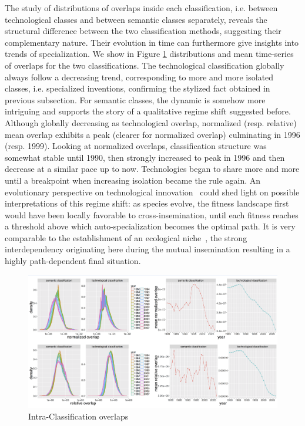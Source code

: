 \documentclass[article]{article}%
\begin{document}
The study of distributions of overlaps inside each classification, i.e. between technological classes and between semantic classes separately, reveals the structural difference between the two classification methods, suggesting their complementary nature. Their evolution in time can furthermore give insights into trends of specialization. We show in Figure \ref{fig:intra-classif-overlap} distributions and mean time-series of overlaps for the two classifications. The technological classification globally always follow a decreasing trend, corresponding to more and more isolated classes, i.e. specialized inventions, confirming the stylized fact obtained in previous subsection. For semantic classes, the dynamic is somehow more intriguing and supports the story of a qualitative regime shift suggested before. Although globally decreasing as technological overlap, normalized (resp. relative) mean overlap exhibits a peak (clearer for normalized overlap) culminating in 1996 (resp. 1999). Looking at normalized overlaps, classification structure was somewhat stable until 1990, then strongly increased to peak in 1996 and then decrease at a similar pace up to now. Technologies began to share more and more until a breakpoint when increasing isolation became the rule again. An evolutionary perspective on technological innovation~\cite{ziman2003technological} could shed light on possible interpretations of this regime shift: as species evolve, the fitness landscape first would have been locally favorable to cross-insemination, until each fitness reaches a threshold above which auto-specialization becomes the optimal path. It is very comparable to the establishment of an ecological niche~\cite{holland2012signals}, the strong interdependency originating here during the mutual insemination resulting in a highly path-dependent final situation. 


\begin{figure}[!ht]
\centering
\includegraphics[width=\textwidth]{figures/Fig7}
\caption{Intra-Classification overlaps}
\label{fig:intra-classif-overlap}
\end{figure}
\end{document}
